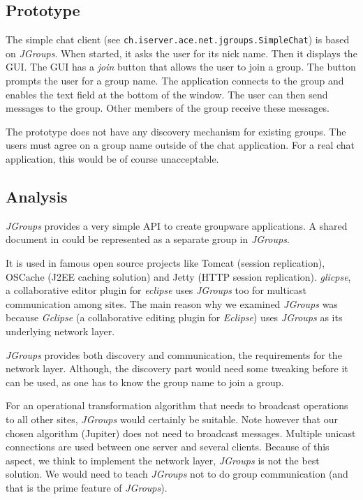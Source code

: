 \subsection{Prototype}
The simple chat client (see \texttt{ch.iserver.ace.net.jgroups.SimpleChat}) is based on \emph{JGroups}. When started, it asks the user for its nick name. Then it displays the GUI. The GUI has a \emph{join} button that allows the user to join a group. The button prompts the user for a group name. The application connects to the group and enables the text field at the bottom of the window. The user can then send messages to the group. Other members of the group receive these messages.

The prototype does not have any discovery mechanism for existing groups. The users must agree on a group name outside of the chat application. For a real chat application, this would be of course unacceptable.


\subsection{Analysis}
\emph{JGroups} provides a very simple API to create groupware applications. A shared document in \ace could be represented as a separate group in \emph{JGroups}. 

It is used in famous open source projects like Tomcat (session replication), OSCache (J2EE caching solution) and Jetty (HTTP session replication). \emph{glicpse}, a collaborative editor plugin for \emph{eclipse} uses \emph{JGroups} too for multicast communication among sites. The main reason why we examined \emph{JGroups} was because \emph{Gclipse} (a collaborative editing plugin for \emph{Eclipse}) uses \emph{JGroups} as its underlying network layer.

\emph{JGroups} provides both discovery and communication, the requirements for the network layer. Although, the discovery part would need some tweaking before it can be used, as one has to know the group name to join a group.

For an operational transformation algorithm that needs to broadcast operations to all other sites, \emph{JGroups} would certainly be suitable. Note however that our chosen algorithm (Jupiter) does not need to broadcast messages. Multiple unicast connections are used between one server and several clients. Because of this aspect, we think to implement the network layer, \emph{JGroups} is not the best solution. We would need to teach \emph{JGroups} not to do group communication (and that is the prime feature of \emph{JGroups}). 

